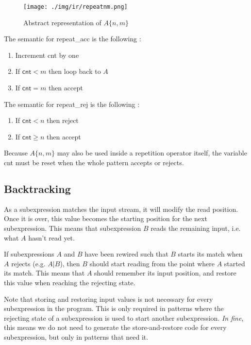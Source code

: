 \documentclass[11pt,a4paper]{report}
\newcommand{\regexp}[1]{$#1$}
\newcommand{\haskell}[1]{\textsf{#1}}
\begin{document}
\begin{figure}[t]
	\centering
	\texttt{[image: ./img/ir/repeatnm.png]}
	\caption{Abstract representation of \regexp{A\{n,m\}}}
	\label{repeatnmir}
\end{figure}

The semantic for \haskell{repeat\_acc} is the following :
\begin{enumerate}
\item Increment \haskell{cnt} by one
\item If $\haskell{cnt} < m$ then loop back to $A$
\item If $\haskell{cnt} = m$ then accept 
\end{enumerate}

The semantic for \haskell{repeat\_rej} is the following :
\begin{enumerate}
\item If $\haskell{cnt} < n$ then reject
\item If $\haskell{cnt} \geq n$ then accept
\end{enumerate}

Because \regexp{A\{n,m\}} may also be used inside a repetition operator itself, the variable \haskell{cnt} must be reset when the whole pattern accepts or rejects.

\subsection{Backtracking}

\label{backtracking}

As a subexpression matches the input stream, it will modify the read position. Once it is over, this value becomes the starting position for the next subexpression. This means that subexpression $B$ reads the remaining input, i.e. what $A$ hasn't read yet.

If subexpressions $A$ and $B$ have been rewired such that $B$ starts its match when $A$ rejects (e.g. \regexp{A|B}), then $B$ should start reading from the point where $A$ started its match. This means that $A$ should remember its input position, and restore this value when reaching the rejecting state.

Note that storing and restoring input values is not necessary for every subexpression in the program. This is only required in patterns where the rejecting state of a subexpression is used to start another subexpression. \textit{In fine}, this means we do not need to generate the store-and-restore code for every subexpression, but only in patterns that need it.
\end{document}

